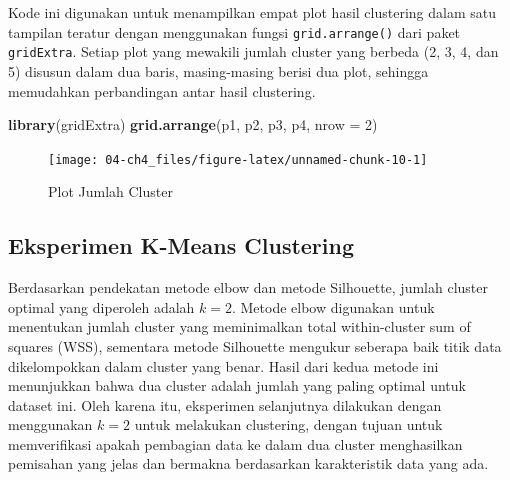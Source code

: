\documentclass[
  oneside]{book}
\newenvironment{Shaded}{\begin{snugshade}}{\end{snugshade}}
\newcommand{\AttributeTok}[1]{\textcolor[rgb]{0.13,0.29,0.53}{#1}}
\newcommand{\DecValTok}[1]{\textcolor[rgb]{0.00,0.00,0.81}{#1}}
\newcommand{\FunctionTok}[1]{\textcolor[rgb]{0.13,0.29,0.53}{\textbf{#1}}}
\newcommand{\NormalTok}[1]{#1}
\begin{document}
Kode ini digunakan untuk menampilkan empat plot hasil clustering dalam satu tampilan teratur dengan menggunakan fungsi \texttt{grid.arrange()} dari paket \texttt{gridExtra}. Setiap plot yang mewakili jumlah cluster yang berbeda (2, 3, 4, dan 5) disusun dalam dua baris, masing-masing berisi dua plot, sehingga memudahkan perbandingan antar hasil clustering.

\begin{Shaded}
\begin{Highlighting}[]
\FunctionTok{library}\NormalTok{(gridExtra)}
\FunctionTok{grid.arrange}\NormalTok{(p1, p2, p3, p4, }\AttributeTok{nrow =} \DecValTok{2}\NormalTok{)}
\end{Highlighting}
\end{Shaded}

\begin{figure}[h]

{\centering \texttt{[image: 04-ch4\_files/figure-latex/unnamed-chunk-10-1]} 

}

\caption{Plot Jumlah Cluster}\label{fig:unnamed-chunk-10}
\end{figure}

\subsection*{Eksperimen K-Means Clustering}\label{eksperimen-k-means-clustering}

Berdasarkan pendekatan metode elbow dan metode Silhouette, jumlah cluster optimal yang diperoleh adalah \(k=2\). Metode elbow digunakan untuk menentukan jumlah cluster yang meminimalkan total within-cluster sum of squares (WSS), sementara metode Silhouette mengukur seberapa baik titik data dikelompokkan dalam cluster yang benar. Hasil dari kedua metode ini menunjukkan bahwa dua cluster adalah jumlah yang paling optimal untuk dataset ini. Oleh karena itu, eksperimen selanjutnya dilakukan dengan menggunakan \(k=2\) untuk melakukan clustering, dengan tujuan untuk memverifikasi apakah pembagian data ke dalam dua cluster menghasilkan pemisahan yang jelas dan bermakna berdasarkan karakteristik data yang ada.
\end{document}
